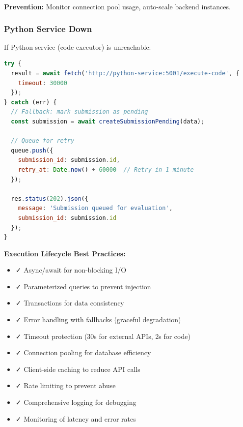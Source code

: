 \documentclass[12pt,a4paper,oneside]{article}
\begin{document}
\textbf{Prevention:} Monitor connection pool usage, auto-scale backend instances.

\subsubsection{Python Service Down}

If Python service (code executor) is unreachable:

\begin{lstlisting}[language=JavaScript, caption=Python Service Fallback]
try {
  result = await fetch('http://python-service:5001/execute-code', {
    timeout: 30000
  });
} catch (err) {
  // Fallback: mark submission as pending
  const submission = await createSubmissionPending(data);
  
  // Queue for retry
  queue.push({
    submission_id: submission.id,
    retry_at: Date.now() + 60000  // Retry in 1 minute
  });
  
  res.status(202).json({
    message: 'Submission queued for evaluation',
    submission_id: submission.id
  });
}
\end{lstlisting}

\begin{importantbox}
\textbf{Execution Lifecycle Best Practices:}

\begin{itemize}
    \item ✓ Async/await for non-blocking I/O
    \item ✓ Parameterized queries to prevent injection
    \item ✓ Transactions for data consistency
    \item ✓ Error handling with fallbacks (graceful degradation)
    \item ✓ Timeout protection (30s for external APIs, 2s for code)
    \item ✓ Connection pooling for database efficiency
    \item ✓ Client-side caching to reduce API calls
    \item ✓ Rate limiting to prevent abuse
    \item ✓ Comprehensive logging for debugging
    \item ✓ Monitoring of latency and error rates
\end{itemize}
\end{importantbox}

\newpage

\end{document}
